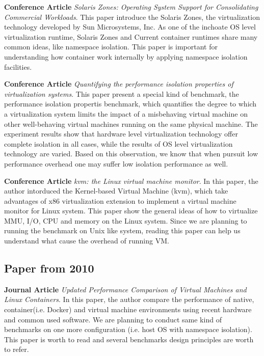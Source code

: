 \documentclass{article}
\begin{document}
\medskip

\textbf{Conference Article} \emph{Solaris Zones: Operating System Support for Consolidating 
Commercial Workloads}\cite{price2004solaris}. This paper introduce the Solaris Zones, the 
virtualization technology developed by Sun Microsystems, Inc. As one of the inchoate OS 
level virtualization runtime, Solaris Zones and Current container runtimes share many common 
ideas, like namespace isolation. This paper is important for understanding how container 
work internally by applying namespace isolation facilities.

\medskip

\textbf{Conference Article} \emph{Quantifying the performance isolation properties of virtualization 
systems}\cite{matthews2007quantifying}. This paper present a special kind of benchmark, the 
performance isolation propertis benchmark, which quantifies the degree to which a virtualization
system limits the impact of a misbehaving virtual machine on other well-behaving virtual machines
running on the same physical machine. The experiment results show that hardware level virtualization
technology offer complete isolation in all cases, while the results of OS level virtualization 
technology are varied. Based on this observation, we know that when pursuit low performance overhead 
one may suffer low isolation performance as well. 

\medskip

\textbf{Conference Article} \emph{kvm: the Linux virtual machine monitor}\cite{kivity2007kvm}. 
In this paper, the author intorduced the Kernel-based Virtual Machine (kvm), which take advantages of
x86 virtualization extension to implement a virtual machine monitor for Linux system. This 
paper show the general ideas of how to virtualize MMU, I/O, CPU and memory on the Linux system.
Since we are planning to running the benchmark on Unix like system, reading this paper can help us 
understand what cause the overhead of running VM.

\subsection{Paper from 2010}

\textbf{Journal Article} \emph{Updated Performance Comparison of Virtual Machines and Linux 
Containers}\cite{felter2014updated}. In this paper, the author compare the performance of 
native, container(i.e. Docker) and virtual machine environments using recent hardware and common 
used software. We are planning to conduct same kind of benchmarks on one more configuration
(i.e. host OS with namespace isolation). This paper is worth to read and several benchmarks 
design principles are worth to refer.
\end{document}
